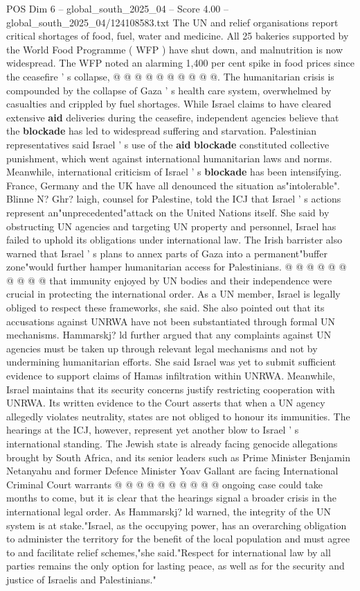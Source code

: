 \begin{textsample}{POS Dim 6 – global\_south\_2025\_04 – Score 4.00 – global\_south\_2025\_04/124108583.txt}
The UN and relief organisations report critical shortages of food, fuel, water and medicine.
All 25 bakeries supported by the World Food Programme ( WFP ) have shut down, and malnutrition is now widespread.
The WFP noted an alarming 1,400 per cent spike in food prices since the ceasefire ' s collapse, @ @ @ @ @ @ @ @ @ @.
The humanitarian crisis is compounded by the collapse of Gaza ' s health care system, overwhelmed by casualties and crippled by fuel shortages.
While Israel claims to have cleared extensive \textbf{aid} deliveries during the ceasefire, independent agencies believe that the \textbf{blockade} has led to widespread suffering and starvation.
Palestinian representatives said Israel ' s use of the \textbf{aid} \textbf{blockade} constituted collective punishment, which went against international humanitarian laws and norms.
Meanwhile, international criticism of Israel ' s \textbf{blockade} has been intensifying.
France, Germany and the UK have all denounced the situation as"intolerable".
Blinne N?
Ghr? laigh, counsel for Palestine, told the ICJ that Israel ' s actions represent an"unprecedented"attack on the United Nations itself.
She said by obstructing UN agencies and targeting UN property and personnel, Israel has failed to uphold its obligations under international law.
The Irish barrister also warned that Israel ' s plans to annex parts of Gaza into a permanent"buffer zone"would further hamper humanitarian access for Palestinians. @ @ @ @ @ @ @ @ @ @ that immunity enjoyed by UN bodies and their independence were crucial in protecting the international order.
As a UN member, Israel is legally obliged to respect these frameworks, she said.
She also pointed out that its accusations against UNRWA have not been substantiated through formal UN mechanisms.
Hammarskj? ld further argued that any complaints against UN agencies must be taken up through relevant legal mechanisms and not by undermining humanitarian efforts.
She said Israel was yet to submit sufficient evidence to support claims of Hamas infiltration within UNRWA.
Meanwhile, Israel maintains that its security concerns justify restricting cooperation with UNRWA.
Its written evidence to the Court asserts that when a UN agency allegedly violates neutrality, states are not obliged to honour its immunities.
The hearings at the ICJ, however, represent yet another blow to Israel ' s international standing.
The Jewish state is already facing genocide allegations brought by South Africa, and its senior leaders such as Prime Minister Benjamin Netanyahu and former Defence Minister Yoav Gallant are facing International Criminal Court warrants @ @ @ @ @ @ @ @ @ @ ongoing case could take months to come, but it is clear that the hearings signal a broader crisis in the international legal order.
As Hammarskj? ld warned, the integrity of the UN system is at stake."Israel, as the occupying power, has an overarching obligation to administer the territory for the benefit of the local population and must agree to and facilitate relief schemes,"she said."Respect for international law by all parties remains the only option for lasting peace, as well as for the security and justice of Israelis and Palestinians."


\end{textsample}
